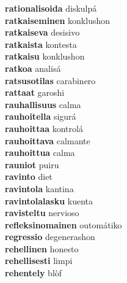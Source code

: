 \textbf{rationalisoida } diskulpá \\
\textbf{ratkaiseminen } konklushon \\
\textbf{ratkaiseva } desisivo \\
\textbf{ratkaista } kontesta \\
\textbf{ratkaisu } konklushon \\
\textbf{ratkoa } analisá \\
\textbf{ratsusotilas } carabinero \\
\textbf{rattaat } garoshi \\
\textbf{rauhallisuus } calma \\
\textbf{rauhoitella } sigurá \\
\textbf{rauhoittaa } kontrolá \\
\textbf{rauhoittava } calmante \\
\textbf{rauhoittua } calma \\
\textbf{rauniot } puiru \\
\textbf{ravinto } diet \\
\textbf{ravintola } kantina \\
\textbf{ravintolalasku } kuenta \\
\textbf{ravisteltu } nervioso \\
\textbf{refleksinomainen } outomátiko \\
\textbf{regressio } degenerashon \\
\textbf{rehellinen } honesto \\
\textbf{rehellisesti } limpi \\
\textbf{rehentely } blòf \\
